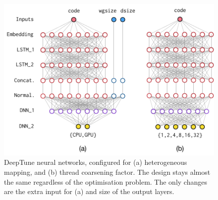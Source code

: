 \begin{figure}[t!]
  \centering
  \includegraphics[width=\columnwidth]{img/nn} %
  \caption[DeepTune neural networks]{%
    DeepTune neural networks, configured for (a) heterogeneous mapping, and (b)
    thread coarsening factor. The design stays almost the same regardless of the
    optimisation problem. The only changes are the extra input for (a) and size of the output layers.%
  }%
  \label{fig:nn}
\end{figure}
